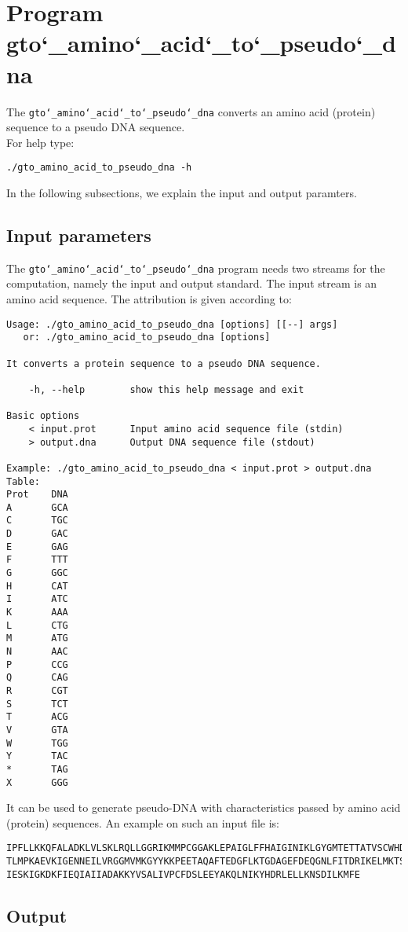 \section{Program gto\char`_amino\char`_acid\char`_to\char`_pseudo\char`_dna}

The \texttt{gto\char`_amino\char`_acid\char`_to\char`_pseudo\char`_dna} converts an amino acid (protein) sequence to a pseudo DNA sequence.\\
For help type:
\begin{lstlisting}
./gto_amino_acid_to_pseudo_dna -h
\end{lstlisting}
In the following subsections, we explain the input and output paramters.

\subsection*{Input parameters}

The \texttt{gto\char`_amino\char`_acid\char`_to\char`_pseudo\char`_dna} program needs two streams for the computation, namely the input and output standard. The input stream is an amino acid sequence.
The attribution is given according to:
\begin{lstlisting}
Usage: ./gto_amino_acid_to_pseudo_dna [options] [[--] args]
   or: ./gto_amino_acid_to_pseudo_dna [options]

It converts a protein sequence to a pseudo DNA sequence.

    -h, --help        show this help message and exit

Basic options
    < input.prot      Input amino acid sequence file (stdin)
    > output.dna      Output DNA sequence file (stdout)

Example: ./gto_amino_acid_to_pseudo_dna < input.prot > output.dna
Table:
Prot	DNA
A		GCA
C		TGC
D		GAC
E		GAG
F		TTT
G		GGC
H		CAT
I		ATC
K		AAA
L		CTG
M		ATG
N		AAC
P		CCG
Q		CAG
R		CGT
S		TCT
T		ACG
V		GTA
W		TGG
Y		TAC
*		TAG
X		GGG
\end{lstlisting}
It can be used to generate pseudo-DNA with characteristics passed by amino acid (protein) sequences. An example on such an input file is:
\begin{lstlisting}
IPFLLKKQFALADKLVLSKLRQLLGGRIKMMPCGGAKLEPAIGLFFHAIGINIKLGYGMTETTATVSCWHDFQFNPNSIG
TLMPKAEVKIGENNEILVRGGMVMKGYYKKPEETAQAFTEDGFLKTGDAGEFDEQGNLFITDRIKELMKTSNGKYIAPQY
IESKIGKDKFIEQIAIIADAKKYVSALIVPCFDSLEEYAKQLNIKYHDRLELLKNSDILKMFE
\end{lstlisting}

\subsection*{Output}

